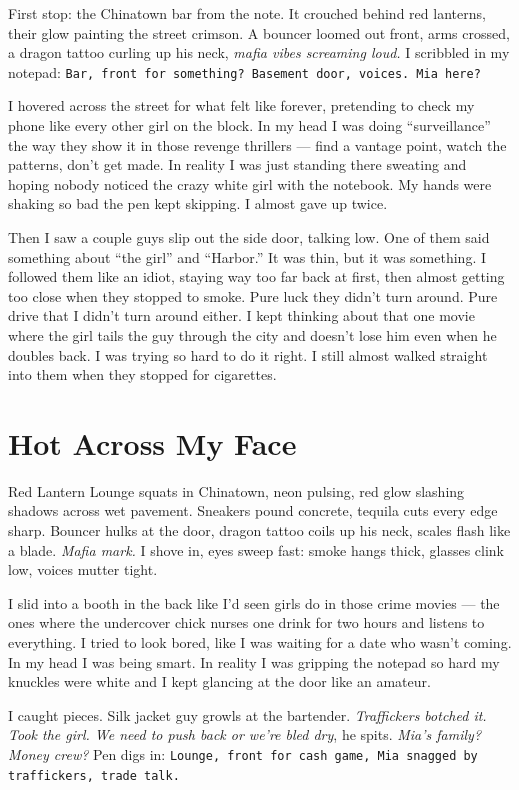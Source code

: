 \documentclass[12pt,oneside]{book}
\newcommand{\note}[1]{\texttt{#1}}
\begin{document}
First stop: the Chinatown bar from the note. It crouched behind red lanterns, their glow painting the street crimson. A bouncer loomed out front, arms crossed, a dragon tattoo curling up his neck, \textit{mafia vibes screaming loud.} I scribbled in my notepad: \note{Bar, front for something? Basement door, voices. Mia here?} 

I hovered across the street for what felt like forever, pretending to check my phone like every other girl on the block. In my head I was doing “surveillance” the way they show it in those revenge thrillers — find a vantage point, watch the patterns, don’t get made. In reality I was just standing there sweating and hoping nobody noticed the crazy white girl with the notebook. My hands were shaking so bad the pen kept skipping. I almost gave up twice. 

Then I saw a couple guys slip out the side door, talking low. One of them said something about “the girl” and “Harbor.” It was thin, but it was something. I followed them like an idiot, staying way too far back at first, then almost getting too close when they stopped to smoke. Pure luck they didn’t turn around. Pure drive that I didn’t turn around either. I kept thinking about that one movie where the girl tails the guy through the city and doesn’t lose him even when he doubles back. I was trying so hard to do it right. I still almost walked straight into them when they stopped for cigarettes.

\chapter{Hot Across My Face}

Red Lantern Lounge squats in Chinatown, neon pulsing, red glow slashing shadows across wet pavement. Sneakers pound concrete, tequila cuts every edge sharp. Bouncer hulks at the door, dragon tattoo coils up his neck, scales flash like a blade. \textit{Mafia mark.} I shove in, eyes sweep fast: smoke hangs thick, glasses clink low, voices mutter tight.

I slid into a booth in the back like I’d seen girls do in those crime movies — the ones where the undercover chick nurses one drink for two hours and listens to everything. I tried to look bored, like I was waiting for a date who wasn’t coming. In my head I was being smart. In reality I was gripping the notepad so hard my knuckles were white and I kept glancing at the door like an amateur.

I caught pieces. Silk jacket guy growls at the bartender. \textit{Traffickers botched it. Took the girl. We need to push back or we’re bled dry}, he spits. \textit{Mia’s family? Money crew?} Pen digs in: \note{Lounge, front for cash game, Mia snagged by traffickers, trade talk.}
\end{document}
